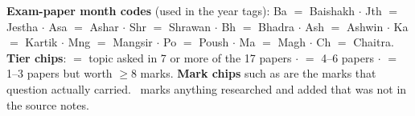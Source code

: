 \vspace{3pt}
{\color{sub}\footnotesize
\textbf{Exam-paper month codes} (used in the year tags):
Ba $=$ Baishakh $\cdot$ Jth $=$ Jestha $\cdot$ Asa $=$ Ashar $\cdot$ Shr $=$ Shrawan $\cdot$
Bh $=$ Bhadra $\cdot$ Ash $=$ Ashwin $\cdot$ Ka $=$ Kartik $\cdot$ Mng $=$ Mangsir $\cdot$
Po $=$ Poush $\cdot$ Ma $=$ Magh $\cdot$ Ch $=$ Chaitra. \\
\textbf{Tier chips}: \tS{} $=$ topic asked in 7 or more of the 17 papers $\cdot$
\tF{} $=$ 4--6 papers $\cdot$ \tP{} $=$ 1--3 papers but worth $\ge$8 marks.
\textbf{Mark chips} such as  are the marks that question actually carried.
\added\ marks anything researched and added that was not in the source notes.}
